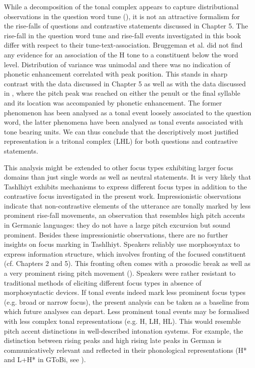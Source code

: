 While a decomposition of the tonal complex appears to capture distributional observations in the question word tune (\citealt{Bruggeman.etal2017}), it is not an attractive formalism for the rise-falls of questions and contrastive statements discussed in Chapter 5. The rise-fall in the question word tune and rise-fall events investigated in this book differ with respect to their tune-text-association. Bruggeman et al. did not find any evidence for an association of the H tone to a constituent below the word level. Distribution of variance was unimodal and there was no indication of phonetic enhancement correlated with peak position. This stands in sharp contrast with the data discussed in Chapter 5 as well as with the data discussed in \citet{Grice.etal2015tash}, where the pitch peak was reached on either the penult or the final syllable and its location was accompanied by phonetic enhancement. The former phenomenon has been analysed as a tonal event loosely associated to the question word, the latter phenomena have been analysed as tonal events associated with tone bearing units. We can thus conclude that the descriptively most justified representation is a tritonal complex (LHL) for both questions and contrastive statements. 

This analysis might be extended to other focus types exhibiting larger focus domains than just single words as well as neutral statements. It is very likely that Tashlhiyt exhibits mechanisms to express different focus types in addition to the contrastive focus investigated in the present work. Impressionistic observations indicate that non-contrastive elements of the utterance are tonally marked by less prominent rise-fall movements, an observation that resembles high pitch accents in Germanic languages: they do not have a large pitch excursion but sound prominent. Besides these impressionistic observations, there are no further insights on focus marking in Tashlhiyt. Speakers reliably use morphosyntax to express information structure, which involves fronting of the focused constituent (cf. Chapters 2 and 5). This fronting often comes with a prosodic break as well as a very prominent rising pitch movement (\citealt{Sadiqi1997,DE2002,MettouchiFleisch2010}). Speakers were rather resistant to traditional methods of eliciting different focus types in absence of morphosyntactic devices. If tonal events indeed mark less prominent focus types (e.g. broad or narrow focus), the present analysis can be taken as a baseline from which future analyses can depart. Less prominent tonal events may be formalised with less complex tonal representations (e.g. H, LH, HL). This would resemble pitch accent distinctions in well-described intonation systems. For example, the distinction between rising peaks and high rising late peaks in German is communicatively relevant and reflected in their phonological representations (H* and L+H* in GToBi, see \citealt{Grice.etal2005ger}).  

